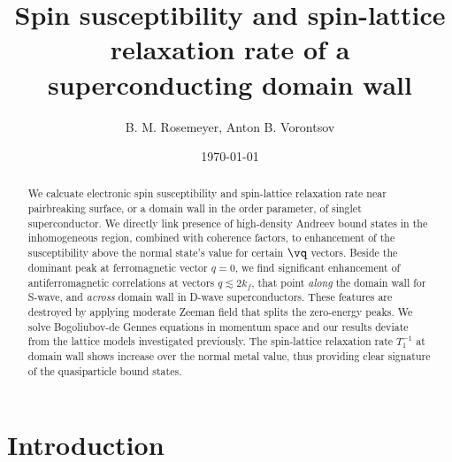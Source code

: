 \documentclass[prb,aps,showpacs,amsmath,twocolumn,10pt]{revtex4-1}
\begin{document}
\title{Spin susceptibility and spin-lattice relaxation rate of a superconducting domain wall}

\author{B. M. Rosemeyer, Anton B. Vorontsov}

\date{\today}

\begin{abstract}
%
We calcuate electronic spin susceptibility and spin-lattice relaxation rate 
near pairbreaking surface, or a domain wall in the order parameter, of singlet superconductor. 
We directly link presence of high-density Andreev bound states in the inhomogeneous region, combined with coherence factors, 
to enhancement of the susceptibility above the normal state's value for certain $\vq$ vectors.  
Beside the dominant peak at ferromagnetic vector $q=0$, we find significant enhancement of 
antiferromagnetic correlations at vectors $q\lesssim 2 k_f$, that point \emph{along} the domain wall for S-wave,  
and \emph{across} domain wall in D-wave superconductors.  
These features are destroyed by applying moderate Zeeman field that splits the zero-energy peaks. 
We solve Bogoliubov-de Gennes equations in momentum space and 
our results deviate from the lattice models investigated previously. 
The spin-lattice relaxation rate $T_1^{-1}$ at domain wall shows increase over the normal metal value, thus  
providing clear signature of the quasiparticle bound states. 
\end{abstract} 


\maketitle


\section{Introduction}
\label{sec:intro}
%
\end{document}
